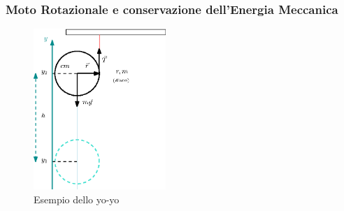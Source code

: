\documentclass{book}
\begin{document}
\subsubsection{Moto Rotazionale e conservazione dell’Energia Meccanica}
\begin{figure}[ht]
  \centering
  \includegraphics[width=5cm]{img/finiti/yoyo.eps}
  \caption{Esempio dello yo-yo}
  \label{fig:rota-meccanica}
\end{figure}
\end{document}

